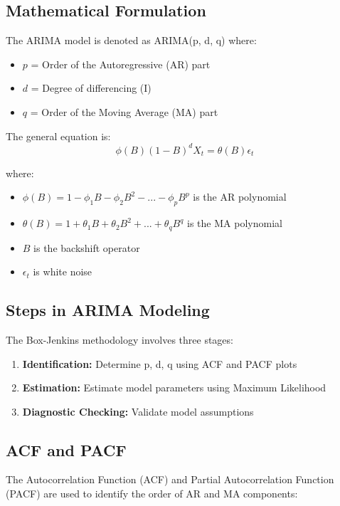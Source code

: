 \documentclass[12pt,a4paper]{report}
\begin{document}
\subsection{Mathematical Formulation}
The ARIMA model is denoted as ARIMA(p, d, q) where:

\begin{itemize}
    \item $p$ = Order of the Autoregressive (AR) part
    \item $d$ = Degree of differencing (I)
    \item $q$ = Order of the Moving Average (MA) part
\end{itemize}

The general equation is:
\begin{equation}
\phi(B)(1-B)^d X_t = \theta(B)\epsilon_t
\end{equation}

where:
\begin{itemize}
    \item $\phi(B) = 1 - \phi_1 B - \phi_2 B^2 - ... - \phi_p B^p$ is the AR polynomial
    \item $\theta(B) = 1 + \theta_1 B + \theta_2 B^2 + ... + \theta_q B^q$ is the MA polynomial
    \item $B$ is the backshift operator
    \item $\epsilon_t$ is white noise
\end{itemize}

\subsection{Steps in ARIMA Modeling}
The Box-Jenkins methodology involves three stages:

\begin{enumerate}
    \item \textbf{Identification:} Determine p, d, q using ACF and PACF plots
    \item \textbf{Estimation:} Estimate model parameters using Maximum Likelihood
    \item \textbf{Diagnostic Checking:} Validate model assumptions
\end{enumerate}

\subsection{ACF and PACF}
\label{subsec:acf_pacf}
The Autocorrelation Function (ACF) and Partial Autocorrelation Function (PACF) are used to identify the order of AR and MA components:
\end{document}
